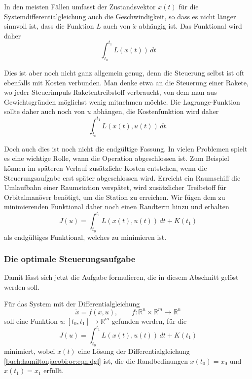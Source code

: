 In den meisten Fällen umfasst der Zustandsvektor $x(t)$ für die
Systemdifferentialgleichung auch die Geschwindigkeit, so dass
es nicht länger sinnvoll ist, dass die Funktion $L$ auch von
$\dot{x}$ abhängig ist.
Das Funktional wird daher
\begin{equation}
\int_{t_0}^{t_1}
L(x(t))
\,dt
\label{buch:hamiltonjacobi:oc:eqn:jx}
\end{equation}

Dies ist aber noch nicht ganz allgemein genug, denn die Steuerung selbst
ist oft ebenfalls mit Kosten verbunden.
Man denke etwa an die Steuerung einer Rakete, wo jeder Steuerimpuls 
Raketentreibstoff verbraucht, von dem man aus Gewichtsgründen möglichst
wenig mitnehmen möchte.
Die Lagrange-Funktion sollte daher auch noch von $u$ abhängen, die
Kostenfunktion wird daher
\begin{equation}
\int_{t_0}^{t_1}
L(x(t),u(t))
\,dt.
\end{equation}

Doch auch dies ist noch nicht die endgültige Fassung.
In vielen Problemen spielt es eine wichtige Rolle, wann die
Operation abgeschlossen ist.
Zum Beispiel können im späteren Verlauf zusätzliche Kosten entstehen,
wenn die Steuerungsaufgabe erst später abgeschlossen wird.
Erreicht ein Raumschiff die Umlaufbahn einer Raumstation verspätet,
wird zusätzlicher Treibstoff für Orbitalmanöver benötigt, um die Station
zu erreichen.
Wir fügen dem zu minimierenden Funktional daher noch einen Randterm
hinzu und erhalten
\begin{equation}
J(u)
=
\int_{t_0}^{t_1}
L(x(t),u(t))
\,dt
+
K(t_1)
\label{buch:hamiltonjacobi:oc:eqn:jk}
\end{equation}
als endgültiges Funktional, welches zu minimieren ist.

%
%
\subsubsection{Die optimale Steuerungsaufgabe}
Damit lässt sich jetzt die Aufgabe formulieren, die in diesem
Abschnitt gelöst werden soll.

\begin{aufgabe}
\label{buch:hamiltonjacobi:oc:aufgabe}
Für das System mit der Differentialgleichung
\begin{equation}
\dot{x}
=
f(x,u), \qquad f\colon \mathbb{R}^n\times\mathbb{R}^m\to\mathbb{R}^n
\label{buch:hamiltonjacobi:oc:eqn:dgl}
\end{equation}
soll eine Funktion $u\colon [t_0,t_1]\to\mathbb{R}^m$ gefunden werden,
für die 
\begin{equation}
J(u)
=
\int_{t_0}^{t_1}
L(x(t),u(t))
\,dt
+
K(t_1)
\label{buch:hamiltonjacobi:oc:eqn:kosten}
\end{equation}
minimiert, wobei $x(t)$ eine Lösung der Differentialgleichung
\eqref{buch:hamiltonjacobi:oc:eqn:dgl} ist, die die Randbedinungen
$x(t_0)=x_0$ und $x(t_1)=x_1$ erfüllt.
\end{aufgabe}

